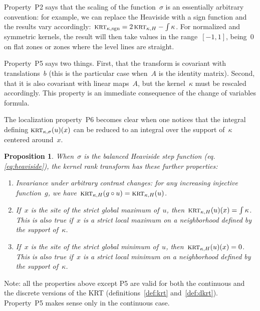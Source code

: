 \documentclass[12pt]{article}                  %
\newtheorem{proposition}{Proposition}
\begin{document}
Property~P2 says that the scaling of the function~$\sigma$ is an essentially
arbitrary convention: for example, we can replace the Heaviside with a sign
function and the results vary
accordingly:~$\textsc{krt}_{\kappa,\mathrm{sgn}}=2\,\textsc{krt}_{\kappa,H}-\int\kappa$.
For normalized and symmetric kernels, the result will then take values in
the range~$[-1,1]$, being~$0$ on flat zones or zones where the level lines
are straight.

Property~P5 says two things.  First, that the transform is covariant with
translations~$b$ (this is the particular case when~$A$ is the identity
matrix).  Second, that it is also covariant with linear maps~$A$, but the
kernel~$\kappa$ must be rescaled accordingly.  This property is an immediate
consequence of the change of variables formula.

The localization property~P6 becomes clear when one notices that the
integral defining $\textsc{krt}_{\kappa,\sigma}(u)(x)$ can be reduced to an
integral over the support of~$\kappa$ centered around~$x$.

\begin{proposition}
	When~$\sigma$ is the balanced Heaviside step function (eq.\ref{eq:heaviside}),
	the kernel rank
	transform has these further properties:
	\begin{enumerate}
		\item[\bf H1] Invariance under arbitrary contrast changes: for
			any increasing injective function~$g$, we
			have~$\textsc{krt}_{\kappa,H}(g\circ
			u)=\textsc{krt}_{\kappa,H}(u)$.
		\item[\bf H2] If~$x$ is the site of the strict global
			maximum of~$u$,
			then~$\textsc{krt}_{\kappa,H}(u)(x)=\int\kappa$.  This is also
			true if~$x$ is a strict local maximum on a
			neighborhood defined by the support of~$\kappa$.
		\item[\bf H3] If~$x$ is the site of the strict global
			minimum of~$u$, then~$\textsc{krt}_{\kappa,H}(u)(x)=0$.  This
			is also true if~$x$ is a strict local minimum on a
			neighborhood defined by the support of~$\kappa$.
	\end{enumerate}
\end{proposition}

Note: all the properties above except P5 are valid for both the continuous
and the discrete versions of the KRT (definitions~\ref{def:krt}
and~\ref{def:dkrt}).  Property~P5 makes sense only in the continuous case.


%
%
%
%
\end{document}
